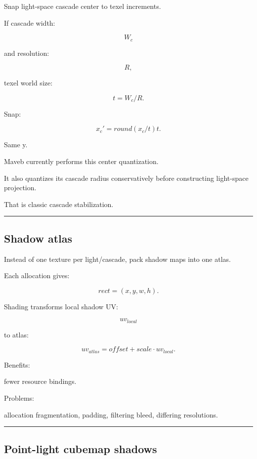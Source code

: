 Snap light-space cascade center to texel increments.

If cascade width:

\[
W_c
\]

and resolution:

\[
R,
\]

texel world size:

\[
t=
W_c/R.
\]

Snap:

\[
\boxed{
x_c'
=
round(x_c/t)t.
}
\]

Same y.

Maveb currently performs this center quantization.

It also quantizes its cascade radius conservatively before constructing light-space projection.

That is classic cascade stabilization.

\begin{center}\rule{0.5\linewidth}{0.5pt}\end{center}

\subsection{Shadow atlas}\label{04-visual-computing-ii-ch040-shadow-atlas}

\hypertarget{04-visual-computing-ii-ch040-shadow-atlas}{}

Instead of one texture per light/cascade, pack shadow maps into one atlas.

Each allocation gives:

\[
rect=
(x,y,w,h).
\]

Shading transforms local shadow UV:

\[
uv_{local}
\]

to atlas:

\[
uv_{atlas}
=
offset+
scale\cdot uv_{local}.
\]

Benefits:

fewer resource bindings.

Problems:

allocation fragmentation, padding, filtering bleed, differing resolutions.

\begin{center}\rule{0.5\linewidth}{0.5pt}\end{center}

\subsection{Point-light cubemap shadows}\label{04-visual-computing-ii-ch040-point-light-cubemap-shadows}

